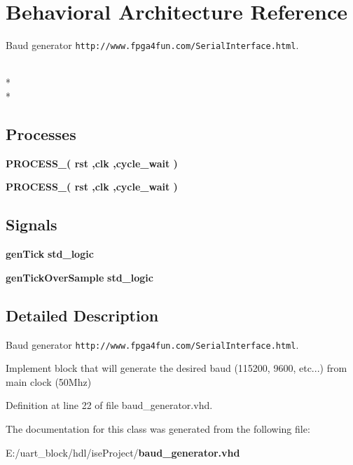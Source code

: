 \section{Behavioral Architecture Reference}
\label{classbaud__generator_1_1_behavioral}


Baud generator {\tt http\-://www.\-fpga4fun.\-com/\-Serial\-Interface.\-html}.  


\\*
\\*
\subsection*{Processes}
 \begin{DoxyCompactItemize}
\item 
{\bf P\-R\-O\-C\-E\-S\-S\-\_}{\bfseries  ( {\bfseries {\bfseries {\bf rst}}   ,{\bfseries {\bf clk}}  ,{\bfseries {\bf cycle\-\_\-wait}}  } )}\label{classbaud__generator_1_1_behavioral_a91cffac6add43aba68e620fbdd18e50d}

\item 
{\bf P\-R\-O\-C\-E\-S\-S\-\_}{\bfseries  ( {\bfseries {\bfseries {\bf rst}}   ,{\bfseries {\bf clk}}  ,{\bfseries {\bf cycle\-\_\-wait}}  } )}\label{classbaud__generator_1_1_behavioral_add080eff6da8ce612cf318df924994d4}

\end{DoxyCompactItemize}
\subsection*{Signals}
 \begin{DoxyCompactItemize}
\item 
{\bf gen\-Tick} {\bfseries std\-\_\-logic } \label{classbaud__generator_1_1_behavioral_a7ab332b1b42deb27e0c8543fa8f39f9f}

\item 
{\bf gen\-Tick\-Over\-Sample} {\bfseries std\-\_\-logic } \label{classbaud__generator_1_1_behavioral_a5870f3a725434b0dbb56fc5da4ac5e0f}

\end{DoxyCompactItemize}


\subsection{Detailed Description}
Baud generator {\tt http\-://www.\-fpga4fun.\-com/\-Serial\-Interface.\-html}. 

Implement block that will generate the desired baud (115200, 9600, etc...) from main clock (50\-Mhz) 

Definition at line 22 of file baud\-\_\-generator.\-vhd.



The documentation for this class was generated from the following file\-:\begin{DoxyCompactItemize}
\item 
E\-:/uart\-\_\-block/hdl/ise\-Project/{\bf baud\-\_\-generator.\-vhd}\end{DoxyCompactItemize}
